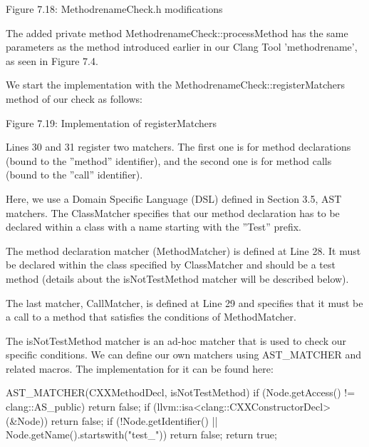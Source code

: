\begin{center}
Figure 7.18: MethodrenameCheck.h modifications
\end{center}


The added private method MethodrenameCheck::processMethod has the same parameters as the method introduced earlier in our Clang Tool ’methodrename’, as seen in Figure 7.4.

We start the implementation with the MethodrenameCheck::registerMatchers method of our check as follows:


\begin{center}
Figure 7.19: Implementation of registerMatchers
\end{center}

Lines 30 and 31 register two matchers. The first one is for method declarations (bound to the ”method” identifier), and the second one is for method calls (bound to the ”call” identifier).

Here, we use a Domain Specific Language (DSL) defined in Section 3.5, AST matchers. The ClassMatcher specifies that our method declaration has to be declared within a class with a name starting with the ”Test” prefix.

The method declaration matcher (MethodMatcher) is defined at Line 28. It must be declared within the class specified by ClassMatcher and should be a test method (details about the isNotTestMethod matcher will be described below).

The last matcher, CallMatcher, is defined at Line 29 and specifies that it must be a call to a method that satisfies the conditions of MethodMatcher.

The isNotTestMethod matcher is an ad-hoc matcher that is used to check our specific conditions. We can define our own matchers using AST\_MATCHER and related macros. The implementation for it can be found here:

\begin{cpp}
AST_MATCHER(CXXMethodDecl, isNotTestMethod) {
  if (Node.getAccess() != clang::AS_public) return false;
  if (llvm::isa<clang::CXXConstructorDecl>(&Node)) return false;
  if (!Node.getIdentifier() || Node.getName().startswith("test_")) return false;
  return true;
}
\end{cpp}

